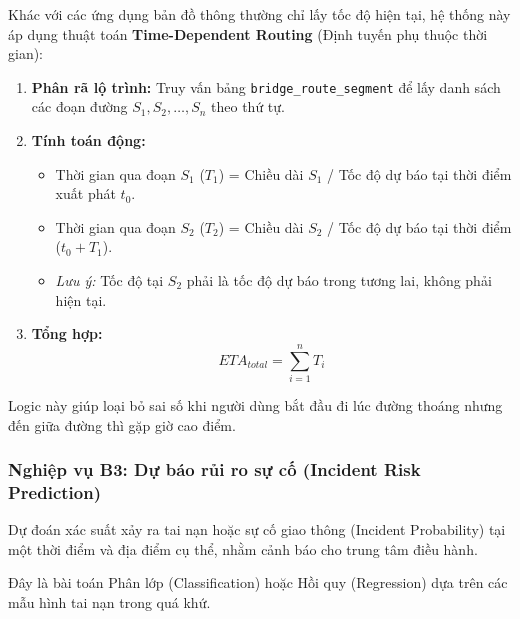 Khác với các ứng dụng bản đồ thông thường chỉ lấy tốc độ hiện tại, hệ thống này áp dụng thuật toán \textbf{Time-Dependent Routing} (Định tuyến phụ thuộc thời gian):

\begin{enumerate}
    \item \textbf{Phân rã lộ trình:} Truy vấn bảng \texttt{bridge\_route\_segment} để lấy danh sách các đoạn đường $S_1, S_2, \dots, S_n$ theo thứ tự.
    \item \textbf{Tính toán động:}
    \begin{itemize}
        \item Thời gian qua đoạn $S_1$ ($T_1$) = Chiều dài $S_1$ / Tốc độ dự báo tại thời điểm xuất phát $t_0$.
        \item Thời gian qua đoạn $S_2$ ($T_2$) = Chiều dài $S_2$ / Tốc độ dự báo tại thời điểm ($t_0 + T_1$).
        \item \textit{Lưu ý:} Tốc độ tại $S_2$ phải là tốc độ dự báo trong tương lai, không phải hiện tại.
    \end{itemize}
    \item \textbf{Tổng hợp:}
    \[ ETA_{total} = \sum_{i=1}^{n} T_i \]
\end{enumerate}
Logic này giúp loại bỏ sai số khi người dùng bắt đầu đi lúc đường thoáng nhưng đến giữa đường thì gặp giờ cao điểm.


\subsubsection{Nghiệp vụ B3: Dự báo rủi ro sự cố (Incident Risk Prediction)}

Dự đoán xác suất xảy ra tai nạn hoặc sự cố giao thông (Incident Probability) tại một thời điểm và địa điểm cụ thể, nhằm cảnh báo cho trung tâm điều hành.

Đây là bài toán Phân lớp (Classification) hoặc Hồi quy (Regression) dựa trên các mẫu hình tai nạn trong quá khứ.

